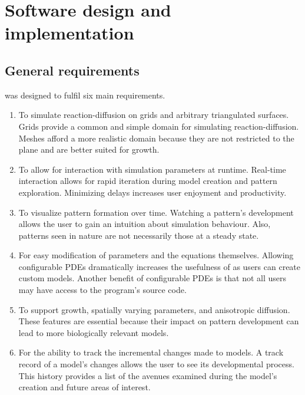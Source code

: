 \chapter{Software design and  implementation}
\section{General requirements} %
\ProgramName{} was designed to fulfil six main requirements.

\begin{enumerate}
	\item To simulate reaction-diffusion on grids and arbitrary triangulated surfaces. Grids provide a common and simple domain for simulating reaction-diffusion. Meshes afford a more realistic domain because they are not restricted to the plane and are better suited for growth. 
	
	\item To allow for interaction with simulation parameters at runtime. Real-time interaction allows for rapid iteration during model creation and pattern exploration. Minimizing delays increases user enjoyment and productivity. %

	\item To visualize pattern formation over time. Watching a pattern's development allows the user to gain an intuition about simulation behaviour. Also, patterns seen in nature are not necessarily those at a steady state.
	
	\item For easy modification of parameters and the equations themselves. Allowing configurable PDEs dramatically increases the usefulness of \ProgramName{} as users can create custom models. Another benefit of configurable PDEs is that not all users may have access to the program's source code. 
		
	\item To support growth, spatially varying parameters, and anisotropic diffusion. These features are essential because their impact on pattern development can lead to more biologically relevant models. 
	
	\item For the ability to track the incremental changes made to models. A track record of a model's changes allows the user to see its developmental process. This history provides a list of the avenues examined during the model's creation and future areas of interest.
\end{enumerate}

